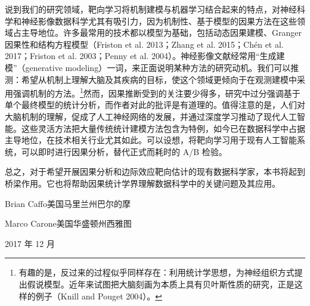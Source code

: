 说到我们的研究领域，靶向学习将机制建模与机器学习结合起来的特点，对神经科学和神经影像数据科学尤其有吸引力，因为机制性、基于模型的因果方法在这些领域占主导地位。许多最常用的技术都以模型为基础，包括动态因果建模、Granger 因果性和结构方程模型（Friston et al. 2013；Zhang et al. 2015；Chén et al. 2017；Friston et al. 2003；Penny et al. 2004）。神经影像文献经常用“生成建模”（generative modeling）一词，来正面说明某种方法的研究动机。我们可以推测：希望从机制上理解大脑及其疾病的目标，使这个领域更倾向于在观测建模中采用强调机制的方法。\footnote{有趣的是，反过来的过程似乎同样存在：利用统计学思想，为神经组织方式提出假说模型。近年来试图把大脑刻画为本质上具有贝叶斯性质的研究，正是这样的例子（Knill and Pouget 2004）。}然而，因果推断受到的关注要少得多，研究中过分强调基于单个最终模型的统计分析，而作者对此的批评是有道理的。值得注意的是，人们对大脑机制的理解，促成了人工神经网络的发展，并通过深度学习推动了现代人工智能。这些灵活方法把大量传统统计建模方法包含为特例，如今已在数据科学中占据主导地位，在技术相关行业尤其如此。可以设想，将靶向学习用于现有人工智能系统，可以即时进行因果分析，替代正式而耗时的 A/B 检验。

总之，对于希望开展因果分析和边际效应靶向估计的现有数据科学家，本书将起到桥梁作用。它也将帮助因果统计学界理解数据科学中的关键问题及其应用。

\begin{flushright}
Brian Caffo\quad 美国马里兰州巴尔的摩\par
Marco Carone\quad 美国华盛顿州西雅图\par
2017 年 12 月
\end{flushright}
